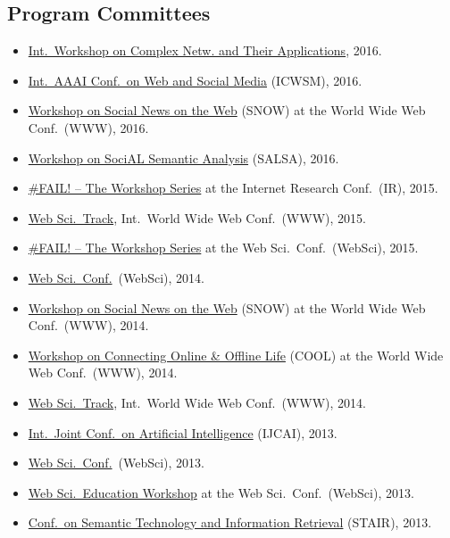 \documentclass[line,margin]{res}
\begin{document}
\begin{resume}
\section{Program Committees}
\begin{itemize}
\item \href{http://complexnetworks.org/index2016.html}{Int.\ Workshop on
  Complex Netw. and Their Applications}, 2016.  
\item \href{http://www.icwsm.org/2016/index.php}{Int.\ AAAI Conf.\ on
  Web and Social Media} (ICWSM), 2016.
\item \href{http://www.snow-workshop.org/}{Workshop on Social News on
  the Web} (SNOW) at the World Wide Web Conf.\ (WWW), 2016. 
\item \href{http://events.kmi.open.ac.uk/salsa2016/}{Workshop on SociAL
  Semantic Analysis} (SALSA), 2016.
\item \href{https://failworkshops.wordpress.com/fail-at-ir16/}{\#FAIL!
  -- The Workshop Series} at the Internet Research Conf.\ (IR), 2015.
\item \href{http://www.www2015.it/call-for-web-science-track/}{Web
  Sci.\ Track}, Int.\ World Wide Web Conf.\ (WWW), 2015.
\item \href{https://failworkshops.wordpress.com/fail-workshop-at-websci15/}{\#FAIL! -- The Workshop Series} at the Web Sci.\ Conf.\ (WebSci), 2015.
\item \href{http://www.websci14.org/}{Web Sci.\ Conf.}\ (WebSci),
  2014. 
\item \href{http://www.snow-workshop.org/}{Workshop on Social News on
  the Web} (SNOW) at the World Wide Web Conf.\ (WWW), 2014.
\item \href{http://www.cool2014.com/}{Workshop on Connecting Online \&
  Offline Life} (COOL) at the World Wide Web Conf.\ (WWW), 2014. 
\item \href{http://www2014.kr/calls/call-for-web-science-track/}{Web
  Sci.\ Track}, Int.\ World Wide Web Conf.\ (WWW), 2014.
\item \href{http://ijcai13.org/}{Int.\ Joint Conf.\ on Artificial
  Intelligence} (IJCAI), 2013.  
\item \href{http://www.websci13.org/}{Web Sci.\ Conf.}\ (WebSci), 2013. 
\item \href{http://webscience-education-workshop.blogs.usj.edu.lb/}{Web
  Sci.\ Education Workshop} at the Web Sci.\ Conf.\ (WebSci), 2013. 
\item \href{http://www.ftsm.ukm.my/stair13/}{Conf.\ on Semantic
  Technology and Information Retrieval} (STAIR), 2013. 

\end{itemize}
\end{resume}
\end{document}
